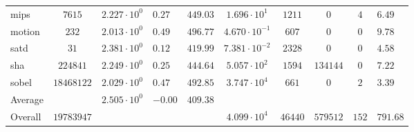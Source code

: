 \begin{tabular}{|l|c|HHc|c|c|c|cH|}
mips          & $ 7615     $ & $ 2.227 \cdot 10^{0} $ & $ 0.27  $ & $ 449.03 $ & $ 1.696 \cdot 10^{1}  $ & $ 1211  $ & $ 0      $ & $ 4   $ & $ 6.49    $ \\
motion        & $ 232      $ & $ 2.013 \cdot 10^{0} $ & $ 0.49  $ & $ 496.77 $ & $ 4.670 \cdot 10^{-1} $ & $ 607   $ & $ 0      $ & $ 0   $ & $ 9.78    $ \\
satd          & $ 31       $ & $ 2.381 \cdot 10^{0} $ & $ 0.12  $ & $ 419.99 $ & $ 7.381 \cdot 10^{-2} $ & $ 2328  $ & $ 0      $ & $ 0   $ & $ 4.58    $ \\
sha           & $ 224841   $ & $ 2.249 \cdot 10^{0} $ & $ 0.25  $ & $ 444.64 $ & $ 5.057 \cdot 10^{2}  $ & $ 1594  $ & $ 134144 $ & $ 0   $ & $ 7.22    $ \\
sobel         & $ 18468122 $ & $ 2.029 \cdot 10^{0} $ & $ 0.47  $ & $ 492.85 $ & $ 3.747 \cdot 10^{4}  $ & $ 661   $ & $ 0      $ & $ 2   $ & $ 3.39    $ \\
\hline
Average       & $          $ & $ 2.505 \cdot 10^{0} $ & $ -0.00 $ & $ 409.38 $ & $                     $ & $       $ & $        $ & $     $ & $         $ \\
\hline
Overall       & $ 19783947 $ & $                    $ & $       $ & $        $ & $ 4.099 \cdot 10^{4}  $ & $ 46440 $ & $ 579512 $ & $ 152 $ & $ 791.68  $ \\
\hline
\end{tabular}
